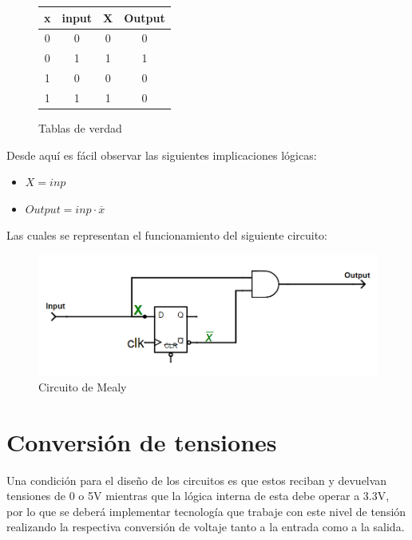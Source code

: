 \begin{figure}[H]
\begin{centering}
\begin{tabular}{|c|c||c|c|}
\hline 
x & input & X & Output\tabularnewline
\hline 
\hline 
0 & 0 & 0 & 0\tabularnewline
\hline 
0 & 1 & 1 & 1\tabularnewline
\hline 
1 & 0 & 0 & 0\tabularnewline
\hline 
1 & 1 & 1 & 0\tabularnewline
\hline 
\end{tabular}
\par\end{centering}
\caption{Tablas de verdad}

\end{figure}

Desde aquí es fácil observar las siguientes implicaciones lógicas:\\
\begin{itemize}
\item $X=inp$
\item $Output=inp\cdot\overline{x}$
\end{itemize}
Las cuales se representan el funcionamiento del siguiente circuito:\\

\begin{figure}[H]
\begin{centering}
\includegraphics[scale=0.8]{../Ejercicio-3/imagenes/E3-TP3-Mealy.png}
\par\end{centering}
\caption{Circuito de Mealy}

\end{figure}

\section{Conversión de tensiones}

Una condición para el diseño de los circuitos es que estos reciban y devuelvan tensiones de 0 o 5V mientras que la lógica interna de esta debe operar a 3.3V, por lo que se deberá implementar tecnología que trabaje con este nivel de tensión realizando la respectiva conversión de voltaje tanto a la entrada como a la salida.\\

